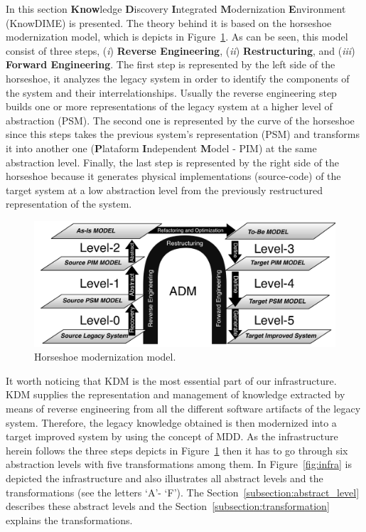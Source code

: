 In this section \textbf{Know}ledge \textbf{D}iscovery \textbf{I}ntegrated \textbf{M}odernization \textbf{E}nvironment (KnowDIME) is presented. The theory behind it is based on the horseshoe modernization model, which is depicts in Figure~\ref{fig:horseshoe}. As can be seen, this model consist of three steps, (\textit{i}) \textbf{Reverse Engineering}, (\textit{ii}) \textbf{Restructuring}, and (\textit{iii}) \textbf{Forward Engineering}. The first step is represented by the left side of the horseshoe, it analyzes the legacy system in order to identify the components of the system and their interrelationships. Usually the reverse engineering step builds one or more representations of the legacy system at a higher level of abstraction (PSM). The second one is represented by the curve of the horseshoe since this steps takes the previous system's representation (PSM) and transforms it into another one (\textbf{P}lataform \textbf{I}ndependent \textbf{M}odel - PIM) at the same abstraction level. Finally, the last step is represented by the right side of the horseshoe because it generates physical implementations (source-code) of the target system at a low abstraction level from the previously restructured representation of the system.

\begin{figure}[!h]
\centering
  \includegraphics[scale=0.6]{Figuras/horseShoeBOM}
\caption{Horseshoe modernization model.}
\label{fig:horseshoe}
\end{figure}

It worth noticing that KDM is the most essential part of our infrastructure. KDM supplies the representation and management of knowledge extracted by means of reverse engineering from all the different software artifacts of the legacy system. Therefore, the legacy knowledge obtained is then modernized into a target improved system by using the concept of MDD. As the infrastructure herein follows the three steps depicts in Figure~\ref{fig:horseshoe} then it has to go through six abstraction levels with five transformations among them. In Figure~\ref{fig:infra} is depicted the infrastructure and also illustrates all abstract levels and the transformations (see the letters `A'- `F'). The Section~\ref{subsection:abstract_level} describes these abstract levels and the Section~\ref{subsection:transformation} explains the transformations.

